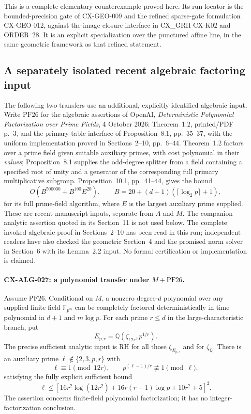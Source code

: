\documentclass[11pt,a4paper]{article}
\begin{document}
This is a complete elementary counterexample proved here. Its run
locator is the bounded-precision gate of CX-GEO-009 and the refined
sparse-gate formulation CX-GEO-012, against the image-closure interface
in CX\_GRH CX-K02 and ORDER~28. It is an explicit specialization over
the punctured affine line, in the same geometric framework as that
refined statement.

\subsection{A separately isolated recent algebraic factoring input}

The following two transfers use an additional, explicitly identified
algebraic input. Write $\mathrm{PF26}$ for the algebraic assertions of
OpenAI, \emph{Deterministic Polynomial Factorization over Prime Fields},
4 October 2026: Theorem~1.2, printed/PDF p.~3, and the primary-table
interface of Proposition~8.1, pp.~35--37, with the uniform implementation
proved in Sections~2--10, pp.~6--44. Theorem~1.2 factors over a prime
field given suitable auxiliary primes, with cost polynomial in their
\emph{values}; Proposition~8.1 supplies the odd-degree splitter from a
field containing a specified root of unity and a generator of the
corresponding full primary multiplicative subgroup. Proposition~10.1,
pp.~41--44, gives the bound
\[
                  O(B^{500000}+B^{100}E^{20}),
\qquad B=20+(d+1)(\lceil\log_2p\rceil+1),
\]
for its full prime-field algorithm, where $E$ is the largest auxiliary
prime supplied. These are recent-manuscript inputs, separate from $A$
and $M$. The companion analytic assertion quoted in its Section~11 is
not used below. The complete invoked algebraic proof in Sections~2--10
has been read in this run; independent readers have also checked the
geometric Section~4 and the promised norm solver in Section~6 with its
Lemma~2.2 input. No formal certification or implementation is claimed.

\paragraph{CX-ALG-027: a polynomial transfer under $M+\mathrm{PF26}$.}
Assume $\mathrm{PF26}$. Conditional on $M$, a nonzero degree-$d$ polynomial
over any supplied finite field $\mathbb F_{p^m}$ can be completely
factored deterministically in time polynomial in $d+1$ and
$m\log p$. For each prime $r\le d$ in the large-characteristic
branch, put
\[
 E_{p,r}=\mathbb Q(\zeta_{12r},p^{1/r}).
\]
The precise sufficient analytic input is RH for all those
$\zeta_{E_{p,r}}$ and for $\zeta_{\mathbb Q}$.
There is an auxiliary prime $\ell\notin\{2,3,p,r\}$ with
\[
 \ell\equiv1\pmod{12r},\qquad
 p^{(\ell-1)/r}\not\equiv1\pmod\ell,
\]
satisfying the fully explicit sufficient bound
\[
 \ell\le
 \left[16r^2\log(12r^2)+16r(r-1)\log p+10r^2+5\right]^2.
 \tag{CX-PF26-prime}
\]
The assertion concerns finite-field polynomial factorization; it has
no integer-factorization conclusion.
\end{document}
